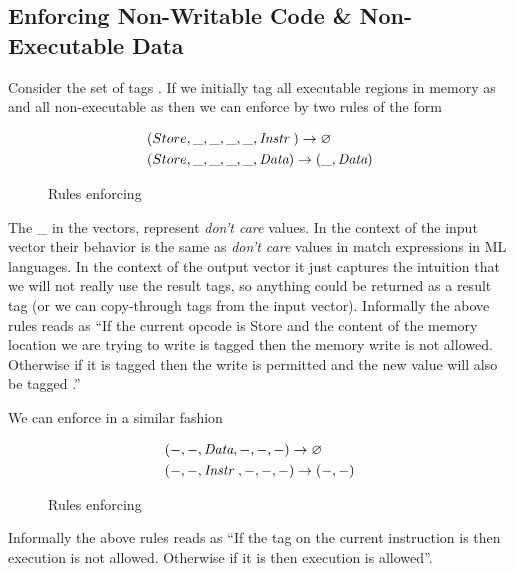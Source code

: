 \subsection{Enforcing Non-Writable Code \& Non-Executable Data}
\label{sec:nwc_nxd}

Consider the set of tags \TAGS{\DATA,\INSTRname}. If we initially tag
all executable regions in memory as \INSTR{} and all non-executable as \DATAname
then we can enforce \NWCname by two rules of the form

\begin{figure}[!htpb]
\begin{align*}
 & (Store, \_,\_, \_, \_,\textit{Instr}~) \rightarrow \varnothing \\
 & (Store, \_,\_, \_, \_,\textit{Data}) \rightarrow (\_, \textit{Data})
\end{align*}
\caption{Rules enforcing \NWC}
\end{figure}

The \_ in the vectors, represent \textit{don't care} values. In the context of
the input vector their behavior is the same as \textit{don't care} values in
match expressions in ML languages. In the context of the output vector it just
captures the intuition that we will not really use the result tags, so anything
could be returned as a result tag (\IE \DATAname or we can copy-through tags
from the input vector).
Informally the above rules reads as ``If the current opcode is Store and the
content of the memory location we are trying to write is tagged \INSTR{}
then the memory write is not allowed. Otherwise if it is tagged \DATAname then
the write is permitted and the new value will also be tagged \DATA.''

We can enforce \NXDname in a similar fashion
\begin{figure}[!htpb]
\begin{align*}
 & (-, -,\textit{Data}, -, -, -) \rightarrow \varnothing \\
 & (-, -,\textit{Instr}~, -, -,-) \rightarrow (-, -)
\end{align*}
\caption{Rules enforcing \NXD}
\end{figure}

Informally the above rules reads as ``If the tag on the current instruction is
\DATAname then execution is not allowed. Otherwise if it is \INSTRname then
execution is allowed''.

\\
\\

